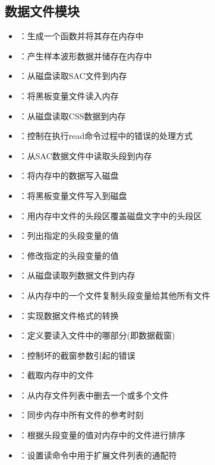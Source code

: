 \subsection*{数据文件模块}
\begin{itemize}
\item {}：生成一个函数并将其存在内存中
\item {}：产生样本波形数据并储存在内存中
\item {}：从磁盘读取SAC文件到内存
\item {}：将黑板变量文件读入内存
\item {}：从磁盘读取CSS数据到内存
\item {}：控制在执行read命令过程中的错误的处理方式
\item {}：从SAC数据文件中读取头段到内存
\item {}：将内存中的数据写入磁盘
\item {}：将黑板变量文件写入到磁盘
\item {}：用内存中文件的头段区覆盖磁盘文字中的头段区
\item {}：列出指定的头段变量的值
\item {}：修改指定的头段变量的值
\item {}：从磁盘读取列数据文件到内存
\item {}：从内存中的一个文件复制头段变量给其他所有文件
\item {}：实现数据文件格式的转换
\item {}：定义要读入文件中的哪部分(即数据截窗)
\item {}：控制坏的截窗参数引起的错误
\item {}：截取内存中的文件
\item {}：从内存文件列表中删去一个或多个文件
\item {}：同步内存中所有文件的参考时刻
\item {}：根据头段变量的值对内存中的文件进行排序
\item {}：设置读命令中用于扩展文件列表的通配符
\end{itemize}

